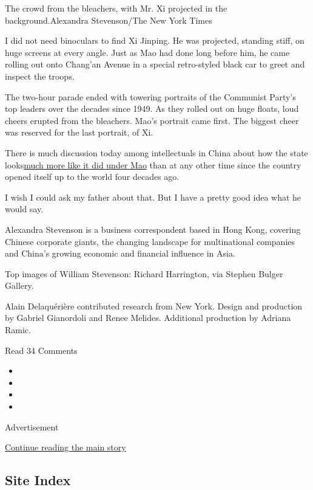 The crowd from the bleachers, with Mr. Xi projected in the
background.Alexandra Stevenson/The New York Times

I did not need binoculars to find Xi Jinping. He was projected, standing
stiff, on huge screens at every angle. Just as Mao had done long before
him, he came rolling out onto Chang'an Avenue in a special retro-styled
black car to greet and inspect the troops.

The two-hour parade ended with towering portraits of the Communist
Party's top leaders over the decades since 1949. As they rolled out on
huge floats, loud cheers erupted from the bleachers. Mao's portrait came
first. The biggest cheer was reserved for the last portrait, of Xi.

There is much discussion today among intellectuals in China about how
the state
looks\href{https://www.nytimes.com/interactive/2017/11/09/world/asia/xi-propaganda.html}{}\href{https://www.nytimes.com/interactive/2017/11/09/world/asia/xi-propaganda.html}{much
more like it did under Mao} than at any other time since the country
opened itself up to the world four decades ago.

I wish I could ask my father about that. But I have a pretty good idea
what he would say.

Alexandra Stevenson is a business correspondent based in Hong Kong,
covering Chinese corporate giants, the changing landscape for
multinational companies and China's growing economic and financial
influence in Asia.

Top images of William Stevenson: Richard Harrington, via Stephen Bulger
Gallery.

Alain Delaquérière contributed research from New York. Design and
production by Gabriel Gianordoli and Renee Melides. Additional
production by Adriana Ramic.

Read 34 Comments

\begin{itemize}
\item
\item
\item
\item
\end{itemize}

Advertisement

\protect\hyperlink{after-bottom}{Continue reading the main story}

\hypertarget{site-index}{%
\subsection{Site Index}\label{site-index}}

